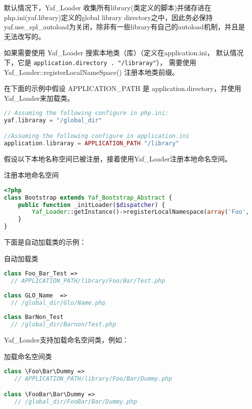 默认情况下，Yaf\_Loader 收集所有library(类定义的脚本)并储存进在 php.ini(yaf.library)定义的global library directory之中，因此务必保持yaf.use\_spl\_autoload为关闭，除非有一些library有自己的autoload机制，并且是无法改写的。

如果需要使用 Yaf\_Loader 搜索本地类（库）（定义在application.ini， 默认情况下，它是 \texttt{application.directory . "/libraray"}）， 需要使用 Yaf\_Loader::registerLocalNameSpace() 注册本地类前缀。

在下面的示例中假设 APPLICATION\_PATH 是 application.directory，并使用Yaf\_Loader来加载类。


\begin{lstlisting}[language=PHP]
// Assuming the following configure in php.ini:
yaf.libraray = "/global_dir"

//Assuming the following configure in application.ini
application.libraray = APPLICATION_PATH "/library"
\end{lstlisting}

假设以下本地名称空间已被注册，接着使用Yaf\_Loader注册本地命名空间。

\begin{example}
注册本地命名空间
\begin{lstlisting}[language=PHP]
<?php
class Bootstrap extends Yaf_Bootstrap_Abstract {
    public function _initLoader($dispatcher) {
        Yaf_Loader::getInstance()->registerLocalNamespace(array('Foo','Bar'));
    }
}
\end{lstlisting}
\end{example}


下面是自动加载类的示例：

\begin{example}
自动加载类
\begin{lstlisting}[language=PHP]
class Foo_Bar_Test =>
  // APPLICATION_PATH/library/Foo/Bar/Test.php
  
class GLO_Name  =>
  // /global_dir/Glo/Name.php
 
class BarNon_Test
  // /global_dir/Barnon/Test.php
\end{lstlisting}
\end{example}

Yaf\_Loader支持加载命名空间类，例如：

\begin{example}
加载命名空间类
\begin{lstlisting}[language=PHP]
class \Foo\Bar\Dummy =>
   // APPLICATION_PATH/library/Foo/Bar/Dummy.php

class \FooBar\Bar\Dummy =>
   // /global_dir/FooBar/Bar/Dummy.php
\end{lstlisting}
\end{example}

